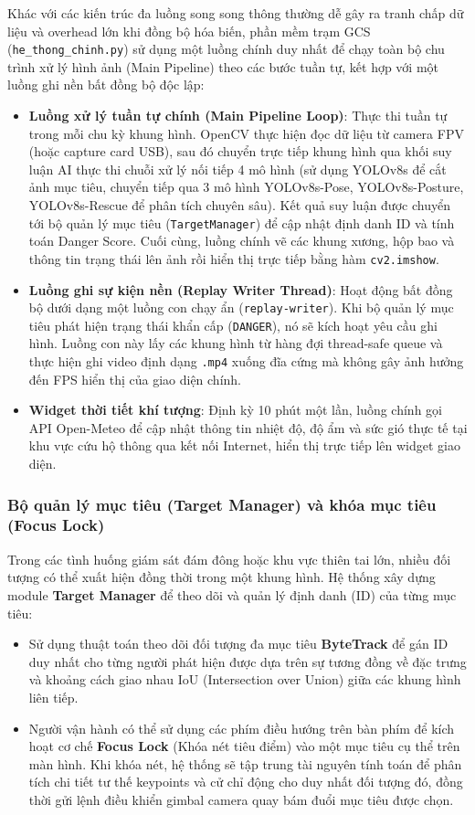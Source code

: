 Khác với các kiến trúc đa luồng song song thông thường dễ gây ra tranh chấp dữ liệu và overhead lớn khi đồng bộ hóa biến, phần mềm trạm GCS (\texttt{he\_thong\_chinh.py}) sử dụng một luồng chính duy nhất để chạy toàn bộ chu trình xử lý hình ảnh (Main Pipeline) theo các bước tuần tự, kết hợp với một luồng ghi nền bất đồng bộ độc lập:
\begin{itemize}
    \item \textbf{Luồng xử lý tuần tự chính (Main Pipeline Loop)}: Thực thi tuần tự trong mỗi chu kỳ khung hình. OpenCV thực hiện đọc dữ liệu từ camera FPV (hoặc capture card USB), sau đó chuyển trực tiếp khung hình qua khối suy luận AI thực thi chuỗi xử lý nối tiếp 4 mô hình (sử dụng YOLOv8s để cắt ảnh mục tiêu, chuyển tiếp qua 3 mô hình YOLOv8s-Pose, YOLOv8s-Posture, YOLOv8s-Rescue để phân tích chuyên sâu). Kết quả suy luận được chuyển tới bộ quản lý mục tiêu (\texttt{TargetManager}) để cập nhật định danh ID và tính toán Danger Score. Cuối cùng, luồng chính vẽ các khung xương, hộp bao và thông tin trạng thái lên ảnh rồi hiển thị trực tiếp bằng hàm \texttt{cv2.imshow}.
    \item \textbf{Luồng ghi sự kiện nền (Replay Writer Thread)}: Hoạt động bất đồng bộ dưới dạng một luồng con chạy ẩn (\texttt{replay-writer}). Khi bộ quản lý mục tiêu phát hiện trạng thái khẩn cấp (\texttt{DANGER}), nó sẽ kích hoạt yêu cầu ghi hình. Luồng con này lấy các khung hình từ hàng đợi thread-safe queue và thực hiện ghi video định dạng \texttt{.mp4} xuống đĩa cứng mà không gây ảnh hưởng đến FPS hiển thị của giao diện chính.
    \item \textbf{Widget thời tiết khí tượng}: Định kỳ 10 phút một lần, luồng chính gọi API Open-Meteo để cập nhật thông tin nhiệt độ, độ ẩm và sức gió thực tế tại khu vực cứu hộ thông qua kết nối Internet, hiển thị trực tiếp lên widget giao diện.
\end{itemize}


\subsubsection{Bộ quản lý mục tiêu (Target Manager) và khóa mục tiêu (Focus Lock)}

Trong các tình huống giám sát đám đông hoặc khu vực thiên tai lớn, nhiều đối tượng có thể xuất hiện đồng thời trong một khung hình. Hệ thống xây dựng module \textbf{Target Manager} để theo dõi và quản lý định danh (ID) của từng mục tiêu:
\begin{itemize}
    \item Sử dụng thuật toán theo dõi đối tượng đa mục tiêu \textbf{ByteTrack} để gán ID duy nhất cho từng người phát hiện được dựa trên sự tương đồng về đặc trưng và khoảng cách giao nhau IoU (Intersection over Union) giữa các khung hình liên tiếp.
    \item Người vận hành có thể sử dụng các phím điều hướng trên bàn phím để kích hoạt cơ chế \textbf{Focus Lock} (Khóa nét tiêu điểm) vào một mục tiêu cụ thể trên màn hình. Khi khóa nét, hệ thống sẽ tập trung tài nguyên tính toán để phân tích chi tiết tư thế keypoints và cử chỉ động cho duy nhất đối tượng đó, đồng thời gửi lệnh điều khiển gimbal camera quay bám đuổi mục tiêu được chọn.
\end{itemize}

